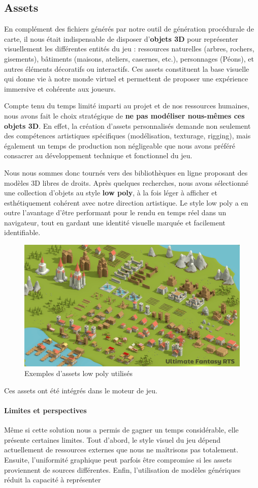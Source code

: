\subsection{Assets}

En complément des fichiers générés par notre outil de génération procédurale de carte, il nous était indispensable de disposer d’\textbf{objets 3D} pour représenter visuellement les différentes entités du jeu : ressources naturelles (arbres, rochers, gisements), bâtiments (maisons, ateliers, casernes, etc.), personnages (Péons), et autres éléments décoratifs ou interactifs. Ces assets constituent la base visuelle qui donne vie à notre monde virtuel et permettent de proposer une expérience immersive et cohérente aux joueurs.

Compte tenu du temps limité imparti au projet et de nos ressources humaines, nous avons fait le choix stratégique de \textbf{ne pas modéliser nous-mêmes ces objets 3D}. En effet, la création d’assets personnalisés demande non seulement des compétences artistiques spécifiques (modélisation, texturage, rigging), mais également un temps de production non négligeable que nous avons préféré consacrer au développement technique et fonctionnel du jeu.

Nous nous sommes donc tournés vers des bibliothèques en ligne proposant des modèles 3D libres de droits\cite{assetPack}. Après quelques recherches, nous avons sélectionné une collection d’objets au style \textbf{low poly}, à la fois léger à afficher et esthétiquement cohérent avec notre direction artistique. Le style low poly a en outre l’avantage d’être performant pour le rendu en temps réel dans un navigateur, tout en gardant une identité visuelle marquée et facilement identifiable.

\begin{figure}[!h]
    \centering
    \includegraphics[width=0.5\linewidth]{images/assets.png}
    \caption{Exemples d'assets low poly utilisés}
    \label{fig:assets}
\end{figure}

Ces assets ont été intégrés dans le moteur de jeu.

\paragraph{Limites et perspectives}

Même si cette solution nous a permis de gagner un temps considérable, elle présente certaines limites. Tout d’abord, le style visuel du jeu dépend actuellement de ressources externes que nous ne maîtrisons pas totalement. Ensuite, l’uniformité graphique peut parfois être compromise si les assets proviennent de sources différentes. Enfin, l’utilisation de modèles génériques réduit la capacité à représenter


